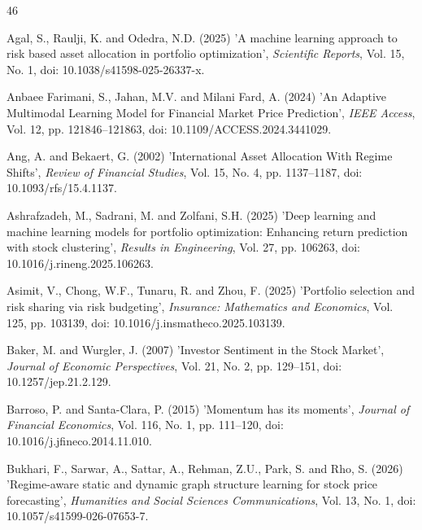\begin{thebibliography}{46}

Agal, S., Raulji, K. and Odedra, N.D. (2025) 'A machine learning approach to risk based asset allocation in portfolio optimization', {\it Scientific Reports}, Vol. 15, No. 1, doi: 10.1038/s41598-025-26337-x.

Anbaee Farimani, S., Jahan, M.V. and Milani Fard, A. (2024) 'An Adaptive Multimodal Learning Model for Financial Market Price Prediction', {\it IEEE Access}, Vol. 12, pp. 121846--121863, doi: 10.1109/ACCESS.2024.3441029.

Ang, A. and Bekaert, G. (2002) 'International Asset Allocation With Regime Shifts', {\it Review of Financial Studies}, Vol. 15, No. 4, pp. 1137--1187, doi: 10.1093/rfs/15.4.1137.

Ashrafzadeh, M., Sadrani, M. and Zolfani, S.H. (2025) 'Deep learning and machine learning models for portfolio optimization: Enhancing return prediction with stock clustering', {\it Results in Engineering}, Vol. 27, pp. 106263, doi: 10.1016/j.rineng.2025.106263.

Asimit, V., Chong, W.F., Tunaru, R. and Zhou, F. (2025) 'Portfolio selection and risk sharing via risk budgeting', {\it Insurance: Mathematics and Economics}, Vol. 125, pp. 103139, doi: 10.1016/j.insmatheco.2025.103139.

Baker, M. and Wurgler, J. (2007) 'Investor Sentiment in the Stock Market', {\it Journal of Economic Perspectives}, Vol. 21, No. 2, pp. 129--151, doi: 10.1257/jep.21.2.129.

Barroso, P. and Santa-Clara, P. (2015) 'Momentum has its moments', {\it Journal of Financial Economics}, Vol. 116, No. 1, pp. 111--120, doi: 10.1016/j.jfineco.2014.11.010.

Bukhari, F., Sarwar, A., Sattar, A., Rehman, Z.U., Park, S. and Rho, S. (2026) 'Regime-aware static and dynamic graph structure learning for stock price forecasting', {\it Humanities and Social Sciences Communications}, Vol. 13, No. 1, doi: 10.1057/s41599-026-07653-7.


\end{thebibliography}

